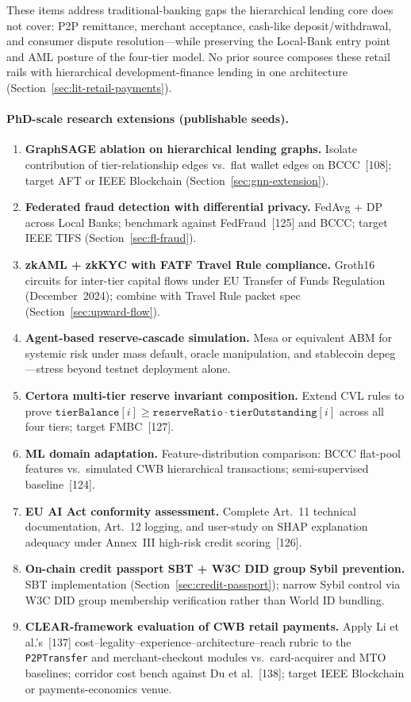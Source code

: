 \documentclass[12pt,a4paper]{report}
\begin{document}
These items address traditional-banking gaps the hierarchical lending core does not cover: P2P remittance, merchant acceptance, cash-like deposit/withdrawal, and consumer dispute resolution---while preserving the Local-Bank entry point and AML posture of the four-tier model. No prior source composes these retail rails with hierarchical development-finance lending in one architecture (Section~\ref{sec:lit-retail-payments}).

\paragraph{PhD-scale research extensions (publishable seeds).}
\begin{enumerate}[noitemsep]
\item \textbf{GraphSAGE ablation on hierarchical lending graphs.} Isolate contribution of tier-relationship edges vs.\ flat wallet edges on BCCC~[108]; target AFT or IEEE Blockchain (Section~\ref{sec:gnn-extension}).
\item \textbf{Federated fraud detection with differential privacy.} FedAvg + DP across Local Banks; benchmark against FedFraud~[125] and BCCC; target IEEE TIFS (Section~\ref{sec:fl-fraud}).
\item \textbf{zkAML + zkKYC with FATF Travel Rule compliance.} Groth16 circuits for inter-tier capital flows under EU Transfer of Funds Regulation (December~2024); combine with Travel Rule packet spec (Section~\ref{sec:upward-flow}).
\item \textbf{Agent-based reserve-cascade simulation.} Mesa or equivalent ABM for systemic risk under mass default, oracle manipulation, and stablecoin depeg---stress beyond testnet deployment alone.
\item \textbf{Certora multi-tier reserve invariant composition.} Extend CVL rules to prove $\texttt{tierBalance}[i] \ge \texttt{reserveRatio} \cdot \texttt{tierOutstanding}[i]$ across all four tiers; target FMBC~[127].
\item \textbf{ML domain adaptation.} Feature-distribution comparison: BCCC flat-pool features vs.\ simulated CWB hierarchical transactions; semi-supervised baseline~[124].
\item \textbf{EU AI Act conformity assessment.} Complete Art.~11 technical documentation, Art.~12 logging, and user-study on SHAP explanation adequacy under Annex~III high-risk credit scoring~[126].
\item \textbf{On-chain credit passport SBT + W3C DID group Sybil prevention.} SBT implementation (Section~\ref{sec:credit-passport}); narrow Sybil control via W3C DID group membership verification rather than World ID bundling.
\item \textbf{CLEAR-framework evaluation of CWB retail payments.} Apply Li et al.'s~[137] cost--legality--experience--architecture--reach rubric to the \texttt{P2PTransfer} and merchant-checkout modules vs.\ card-acquirer and MTO baselines; corridor cost bench against Du et al.~[138]; target IEEE Blockchain or payments-economics venue.
\end{enumerate}
\end{document}
